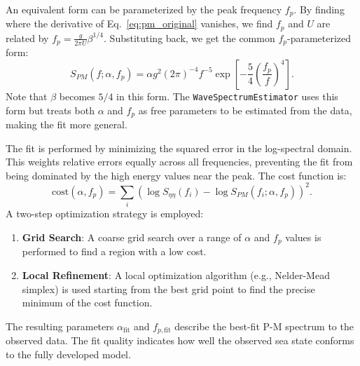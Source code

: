 \documentclass[11pt,letterpaper]{article}
\begin{document}
    An equivalent form can be parameterized by the peak frequency $f_p$. By finding where the derivative of Eq.~\ref{eq:pm_original} vanishes, we find $f_p$ and $U$ are related by $f_p = \frac{g}{2\pi U} \beta^{1/4}$. Substituting back, we get the common $f_p$-parameterized form:
    \begin{equation}
        \label{eq:pm_fp}
        S_{PM}(f;\alpha, f_p) = \alpha g^2 (2\pi)^{-4} f^{-5} \exp\left[-\frac{5}{4}\left(\frac{f_p}{f}\right)^4\right].
    \end{equation}
    Note that $\beta$ becomes $5/4$ in this form. The \texttt{WaveSpectrumEstimator} uses this form but treats both $\alpha$ and $f_p$ as free parameters to be estimated from the data, making the fit more general.

    The fit is performed by minimizing the squared error in the log-spectral domain. This weights relative errors equally across all frequencies, preventing the fit from being dominated by the high energy values near the peak. The cost function is:
    \begin{equation}
        \text{cost}(\alpha, f_p) = \sum_{i} \left(\log S_{\eta\eta}(f_i) - \log S_{PM}(f_i;\alpha, f_p)\right)^2.
    \end{equation}
    A two-step optimization strategy is employed:
    \begin{enumerate}
        \item \textbf{Grid Search}: A coarse grid search over a range of $\alpha$ and $f_p$ values is performed to find a region with a low cost.
        \item \textbf{Local Refinement}: A local optimization algorithm (e.g., Nelder-Mead simplex) is used starting from the best grid point to find the precise minimum of the cost function.
    \end{enumerate}
    The resulting parameters $\alpha_{\text{fit}}$ and $f_{p,\text{fit}}$ describe the best-fit P-M spectrum to the observed data. The fit quality indicates how well the observed sea state conforms to the fully developed model.
\end{document}
